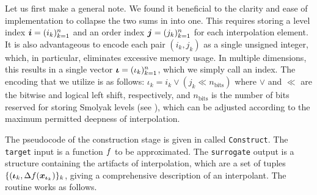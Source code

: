 Let us first make a general note. We found it beneficial to the clarity and ease
of implementation to collapse the two sums in  into one.
This requires storing a level index $\boldsymbol{i} = (i_k)_{k = 1}^n$ and an order index
$\boldsymbol{j} = (j_k)_{k = 1}^n$ for each interpolation element. It is also advantageous
to encode each pair $(i_k, j_k)$ as a single unsigned integer, which, in
particular, eliminates excessive memory usage. In multiple dimensions, this
results in a single vector $\boldsymbol{\iota} = (\iota_k)_{k = 1}^n$, which we simply
call an index. The encoding that we utilize is as follows: $\iota_k = i_k \lor
(j_k \ll n_\text{bits})$ where $\lor$ and $\ll$ are the bitwise  and
logical left shift, respectively, and $n_\text{bits}$ is the number of bits
reserved for storing Smolyak levels (see ), which can be
adjusted according to the maximum permitted deepness of interpolation.

The pseudocode of the construction stage is given in  called
\texttt{Construct}. The \texttt{target} input is a function $f$ to be
approximated. The \texttt{surrogate} output is a structure containing the
artifacts of interpolation, which are a set of tuples $\{ (\boldsymbol{\iota}_k,
\Delta f(\boldsymbol{x}_{\boldsymbol{\iota}_k}) \}_k$, giving a comprehensive description of an
interpolant. The routine works as follows.

